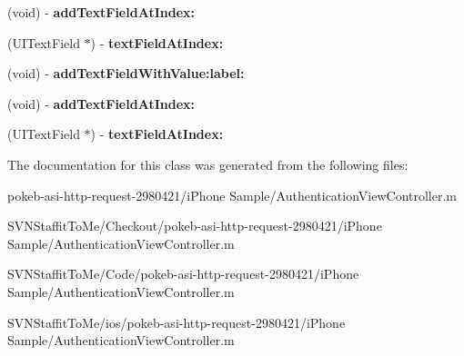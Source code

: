 \begin{DoxyCompactItemize}
\item 
\hypertarget{interface_u_i_alert_view_07_s_p_i_08_a221998f1c3f48e8cb6b39368d26561f8}{
(void) -\/ {\bfseries add\-Text\-Field\-At\-Index\-:}}
\label{interface_u_i_alert_view_07_s_p_i_08_a221998f1c3f48e8cb6b39368d26561f8}

\item 
\hypertarget{interface_u_i_alert_view_07_s_p_i_08_a0c4f860784b97fa2cd5509fbd8f1fe63}{
(\-U\-I\-Text\-Field $\ast$) -\/ {\bfseries text\-Field\-At\-Index\-:}}
\label{interface_u_i_alert_view_07_s_p_i_08_a0c4f860784b97fa2cd5509fbd8f1fe63}

\item 
\hypertarget{interface_u_i_alert_view_07_s_p_i_08_aabdddf6c4e54d664cfecb2d6452de586}{
(void) -\/ {\bfseries add\-Text\-Field\-With\-Value\-:label\-:}}
\label{interface_u_i_alert_view_07_s_p_i_08_aabdddf6c4e54d664cfecb2d6452de586}

\item 
\hypertarget{interface_u_i_alert_view_07_s_p_i_08_a221998f1c3f48e8cb6b39368d26561f8}{
(void) -\/ {\bfseries add\-Text\-Field\-At\-Index\-:}}
\label{interface_u_i_alert_view_07_s_p_i_08_a221998f1c3f48e8cb6b39368d26561f8}

\item 
\hypertarget{interface_u_i_alert_view_07_s_p_i_08_a0c4f860784b97fa2cd5509fbd8f1fe63}{
(\-U\-I\-Text\-Field $\ast$) -\/ {\bfseries text\-Field\-At\-Index\-:}}
\label{interface_u_i_alert_view_07_s_p_i_08_a0c4f860784b97fa2cd5509fbd8f1fe63}

\end{DoxyCompactItemize}


\-The documentation for this class was generated from the following files\-:\begin{DoxyCompactItemize}
\item 
pokeb-\/asi-\/http-\/request-\/2980421/i\-Phone Sample/\-Authentication\-View\-Controller.\-m\item 
\-S\-V\-N\-Staffit\-To\-Me/\-Checkout/pokeb-\/asi-\/http-\/request-\/2980421/i\-Phone Sample/\-Authentication\-View\-Controller.\-m\item 
\-S\-V\-N\-Staffit\-To\-Me/\-Code/pokeb-\/asi-\/http-\/request-\/2980421/i\-Phone Sample/\-Authentication\-View\-Controller.\-m\item 
\-S\-V\-N\-Staffit\-To\-Me/ios/pokeb-\/asi-\/http-\/request-\/2980421/i\-Phone Sample/\-Authentication\-View\-Controller.\-m\end{DoxyCompactItemize}
